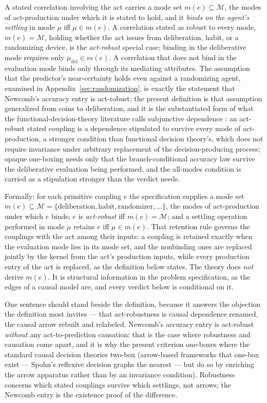 \begin{definition}
\label{def:binding}
A stated correlation involving the act carries a mode set $m(e) \subseteq \mathcal{M}$, the modes of act-production under which it is stated to hold, and it \emph{binds on the agent's settling} in mode $\mu$ iff $\mu \in m(e)$. A correlation stated as robust to every mode, $m(e) = \mathcal{M}$, holding whether the act issues from deliberation, habit, or a randomizing device, is the \emph{act-robust} special case; binding in the deliberative mode requires only $\mu_{\mathrm{del}} \in m(e)$. A correlation that does not bind in the evaluation mode binds only through its mediating attributes. The assumption that the predictor's near-certainty holds even against a randomizing agent, examined in Appendix~\ref{sec:randomization}, is exactly the statement that Newcomb's accuracy entry is act-robust; the present definition is that assumption generalized from coins to deliberation, and it is the substantiated form of what the functional-decision-theory literature calls subjunctive dependence \cite{soares2017fdt}: an act-robust stated coupling is a dependence stipulated to survive every mode of act-production, a stronger condition than functional decision theory's, which does not require invariance under arbitrary replacement of the decision-producing process; opaque one-boxing needs only that the branch-conditional accuracy law survive the deliberative evaluation being performed, and the all-modes condition is carried as a stipulation stronger than the verdict needs.
\end{definition}
\noindent Formally: for each primitive coupling $e$ the specification supplies a mode set $m(e) \subseteq \mathcal{M} = \{\text{deliberation}, \text{habit}, \text{randomizer}, \ldots\}$, the modes of act-production under which $e$ binds; $e$ is \emph{act-robust} iff $m(e) = \mathcal{M}$; and a settling operation performed in mode $\mu$ retains $e$ iff $\mu \in m(e)$. That retention rule governs the couplings with the act among their inputs: a coupling is retained exactly when the evaluation mode lies in its mode set, and the nonbinding ones are replaced jointly by the kernel from the act's production inputs, while every production entry of the act is replaced, as the definition below states. The theory does \emph{not} derive $m(e)$. It is structural information in the problem specification, as the edges of a causal model are, and every verdict below is conditional on it.


One sentence should stand beside the definition, because it answers the objection the definition most invites --- that act-robustness is causal dependence renamed, the causal arrow rebuilt and relabeled. Newcomb's accuracy entry is act-robust \emph{without} any act-to-prediction causation: that is the case where robustness and causation come apart, and it is why the present criterion one-boxes where the standard causal decision theories two-box (arrow-based frameworks that one-box exist --- Spohn's reflexive decision graphs the nearest --- but do so by enriching the arrow apparatus rather than by an invariance condition). Robustness concerns which stated couplings survive which settlings, not arrows; the Newcomb entry is the existence proof of the difference.

